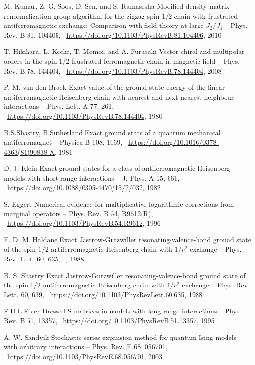 \documentclass[11pt]{article}
\begin{document}
\begin{thebibliography}{3}
 M. Kumar, Z. G. Soos, D. Sen, and S. Ramasesha Modified density matrix renormalization group algorithm for the zigzag spin-1/2 chain with frustrated antiferromagnetic exchange: Comparison with field theory at large $J_2/J_1$ -- Phys. Rev. B 81, 104406, ~\url{https://doi.org/10.1103/PhysRevB.81.104406}, 2010

T. Hikihara, L. Kecke, T. Momoi, and A. Furusaki Vector chiral and multipolar orders in the spin-1/2 frustrated ferromagnetic chain in magnetic field -- Phys. Rev. B 78, 144404,  ~\url{https://doi.org/10.1103/PhysRevB.78.144404}, 2008

P. M. van den Broek Exact value of the ground state energy of the linear antiferromagnetic Heisenberg chain with nearest and next-nearest neighbour interactions -- Phys. Lett. A 77, 261,  ~\url{https://doi.org/10.1103/PhysRevB.78.144404}, 1980

B.S.Shastry, B.Sutherland Exact ground state of a quantum mechanical antiferromagnet -- Physica B 108, 1069,  ~\url{https://doi.org/10.1016/0378-4363(81)90838-X}, 1981

D. J. Klein Exact ground states for a class of antiferromagnetic Heisenberg models with short-range interactions -- J. Phys. A 15, 661,  ~\url{https://doi.org/10.1088/0305-4470/15/2/032}, 1982

S. Eggert Numerical evidence for multiplicative logarithmic corrections from marginal operators -- Phys. Rev. B 54, R9612(R),  ~\url{https://doi.org/10.1103/PhysRevB.54.R9612}, 1996

F. D. M. Haldane Exact Jastrow-Gutzwiller resonating-valence-bond ground state of the spin-$1/2$ antiferromagnetic Heisenberg chain with $1/r^2$ exchange -- Phys. Rev. Lett. 60, 635,  ~\url{}, 1988

B. S. Shastry Exact Jastrow-Gutzwiller resonating-valence-bond ground state of the spin-1/2 antiferromagnetic Heisenberg chain with $1/r^2$ exchange -- Phys. Rev. Lett. 60, 639,  ~\url{https://doi.org/10.1103/PhysRevLett.60.635}, 1988

F.H.L.Ebler Dressed S matrices in models with long-range interactions -- Phys. Rev. B 51, 13357,  ~\url{https://doi.org/10.1103/PhysRevB.51.13357}, 1995

A. W. Sandvik Stochastic series expansion method for quantum Ising models with arbitrary interactions -- Phys. Rev. E 68, 056701,  ~\url{https://doi.org/10.1103/PhysRevE.68.056701}, 2003


\end{thebibliography}
\end{document}

